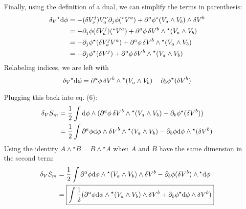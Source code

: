 \documentclass[12pt]{article}
\newcommand{\hodge}{{^\star}}
\begin{document}
Finally, using the definition of a dual, we can simplify the terms in parenthesis:
\begin{align*}
  \var_V\hodge\dd\phi &= -(\var V^j_\nu)V^\nu_a \partial_j\phi (\hodge V^a) + \partial^a\phi \hodge(V_a \wedge V_b) \wedge \var{V^b} \\
  &= -\partial_j\phi (\var V^j_a) (\hodge V^a) + \partial^a\phi \var{V^b} \wedge \hodge(V_a \wedge V_b) \\
  &= -\partial_j\phi \hodge(\var V^j_a V^a) + \partial^a\phi \var{V^b} \wedge \hodge(V_a \wedge V_b) \\
  &= -\partial_j\phi \hodge(\var V^j) + \partial^a\phi \var{V^b} \wedge \hodge(V_a \wedge V_b) \\
\end{align*}
Relabeling indices, we are left with
\begin{align}
  \var_V\hodge\dd\phi = \partial^a\phi \var{V^b} \wedge \hodge(V_a \wedge V_b) -\partial_b\phi \hodge(\var V^b)
\end{align}

Plugging this back into eq. (6):
\begin{align*}
  \var_V{S_m} &= \frac{1}{2} \int \dd\phi \wedge (\partial^a\phi \var{V^b} \wedge \hodge(V_a \wedge V_b) -\partial_b\phi \hodge(\var V^b)) \\
   &= \frac{1}{2} \int \partial^a\phi \dd\phi \wedge \var{V^b} \wedge \hodge(V_a \wedge V_b) - \partial_b\phi \dd\phi \wedge \hodge(\var V^b) \\
\end{align*}
Using the identity $A \wedge \hodge B = B \wedge \hodge A$ when $A$ and $B$ have the same dimension in the second term:
\begin{align}
  \var_V{S_m} &= \frac{1}{2} \int \partial^a\phi \dd\phi \wedge \hodge(V_a \wedge V_b) \wedge \var{V^b} - \partial_b\phi (\var V^b) \wedge \hodge\dd\phi \nonumber \\
  &= \boxed{\int \frac{1}{2}(\partial^a\phi \dd\phi \wedge \hodge(V_a \wedge V_b) \wedge \var{V^b} + \partial_b\phi \hodge\dd\phi \wedge \var{V^b})}
\end{align}
\end{document}
